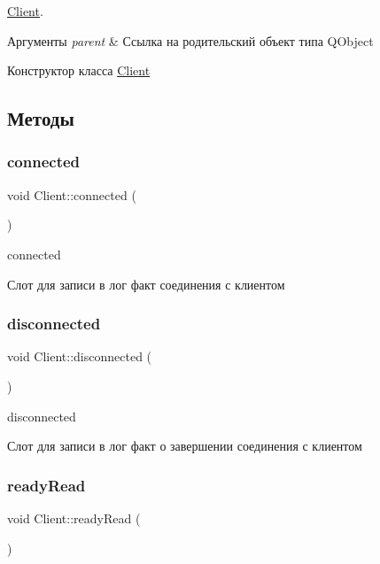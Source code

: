 \hyperlink{classClient}{Client}. 


\begin{DoxyParams}{Аргументы}
{\em parent} & Ссылка на родительский объект типа Q\+Object\\
\hline
\end{DoxyParams}
Конструктор класса \hyperlink{classClient}{Client} 

\subsection{Методы}
\mbox{\label{classClient_a5f3de6434245dc99ceac8601806cb6b1}} 
\subsubsection{\texorpdfstring{connected}{connected}}
{\footnotesize\ttfamily void Client\+::connected (\begin{DoxyParamCaption}{ }\end{DoxyParamCaption})\hspace{0.3cm}{\ttfamily [slot]}}



connected 

Слот для записи в лог факт соединения с клиентом \mbox{\label{classClient_ac2cdeb8b0249c1bf0ddd2167da861ad4}} 
\subsubsection{\texorpdfstring{disconnected}{disconnected}}
{\footnotesize\ttfamily void Client\+::disconnected (\begin{DoxyParamCaption}{ }\end{DoxyParamCaption})\hspace{0.3cm}{\ttfamily [slot]}}



disconnected 

Слот для записи в лог факт о завершении соединения с клиентом \mbox{\label{classClient_acfd4db27c0fec82a26e4d112b585b534}} 
\subsubsection{\texorpdfstring{ready\+Read}{readyRead}}
{\footnotesize\ttfamily void Client\+::ready\+Read (\begin{DoxyParamCaption}{ }\end{DoxyParamCaption})\hspace{0.3cm}{\ttfamily [slot]}}



